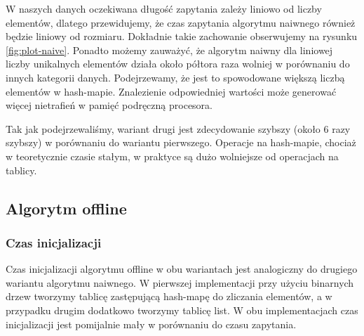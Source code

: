 W naszych danych oczekiwana długość zapytania zależy liniowo od liczby elementów, dlatego przewidujemy, że czas zapytania algorytmu naiwnego również będzie liniowy od rozmiaru. Dokładnie takie zachowanie obserwujemy na rysunku \ref{fig:plot-naive}. Ponadto możemy zauważyć, że algorytm naiwny dla liniowej liczby unikalnych elementów działa około półtora raza wolniej w porównaniu do innych kategorii danych. Podejrzewamy, że jest to spowodowane większą liczbą elementów w hash-mapie. Znalezienie odpowiedniej wartości może generować więcej nietrafień w pamięć podręczną procesora.

Tak jak podejrzewaliśmy, wariant drugi jest zdecydowanie szybszy (około 6 razy szybszy) w porównaniu do wariantu pierwszego. Operacje na hash-mapie, chociaż w teoretycznie czasie stałym, w praktyce są dużo wolniejsze od operacjach na tablicy.


\subsection{Algorytm offline}
\subsubsection{Czas inicjalizacji}
Czas inicjalizacji algorytmu offline w obu wariantach jest analogiczny do drugiego wariantu algorytmu naiwnego. W pierwszej implementacji przy użyciu binarnych drzew tworzymy tablicę zastępującą hash-mapę do zliczania elementów, a w przypadku drugim dodatkowo tworzymy tablicę list. W obu implementacjach czas inicjalizacji jest pomijalnie mały w porównaniu do czasu zapytania.
